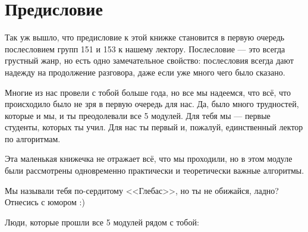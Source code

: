 \documentclass[a4paper, 12pt]{article}
\begin{document}
\titlepage
\thispagestyle{empty}
\pagestyle{fancy}

\newpage
\section*{Предисловие}
Так уж вышло, что предисловие к этой книжке становится в первую очередь послесловием
групп 151 и 153 к нашему лектору. Послесловие --- это всегда грустный жанр, но есть одно
замечательное свойство: послесловия всегда дают надежду на продолжение разговора,
даже если уже много чего было сказано. 

Многие из нас провели с тобой больше года, но все мы надеемся, что всё, что
происходило было не зря в первую очередь для нас. Да, было много трудностей,
которые и мы, и ты преодолевали все 5 модулей. Для тебя мы --- первые студенты,
которых ты учил. Для нас ты первый и, пожалуй, единственный лектор по алгоритмам.

Эта маленькая книжечка не отражает всё, что мы проходили, но в этом модуле были
рассмотрены одновременно практически и теоретически важные алгоритмы.

Мы называли тебя по-сердитому <<Глебас>>, но ты не обижайся, ладно? Отнесись
с юмором :)

Люди, которые прошли все 5 модулей рядом с тобой:
\end{document}

